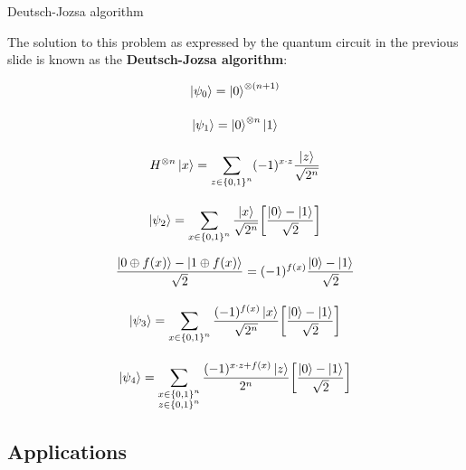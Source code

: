 \documentclass[9pt, handout, aspectratio=169]{beamer}	%
\begin{document}
\begin{frame}[allowframebreaks]{Deutsch-Jozsa algorithm}
\break

	The solution to this problem as expressed by the quantum circuit in the previous slide is known as the \textbf{Deutsch-Jozsa algorithm}:

	\begin{multicols}{2}

		\begin{gather*}
		  \ket{\psi_0} = \ket{0}^{\otimes \qty(n+1)} \\[10pt]
		  \ket{\psi_1} = \ket{0}^{\otimes n} \ket{1} \\[10pt]
			H^{\otimes n} \ket{x} =
		    \sum_{z \in \qty{0,1}^n} (-1)^{x \cdot z}
				\frac{\ket{z}}{\sqrt{2^n}} \\[10pt]
			\ket{\psi_2} =
		    \sum_{x \in \qty{0,1}^n} \frac{\ket{x}}{\sqrt{2^n}}
		    \qty[\frac{\ket{0}-\ket{1}}{\sqrt{2}}]
		\end{gather*}

		\columnbreak

		\begin{gather*}
		  \frac{\ket{0 \oplus f(x)}-\ket{1 \oplus f(x)}}{\sqrt{2}} =
		    (-1)^{f(x)} \frac{\ket{0}-\ket{1}}{\sqrt{2}} \\[10pt]
			\ket{\psi_3} =
		    \sum_{x \in \qty{0,1}^n} \frac{(-1)^{f(x)} \ket{x}}{\sqrt{2^n}}
		    \qty[\frac{\ket{0}-\ket{1}}{\sqrt{2}}] \\[10pt]
			\ket{\psi_4} =
		    \sum_{\substack{x \in \qty{0,1}^n \\ z \in \qty{0,1}^n}}
		    \frac{(-1)^{x \cdot z +f(x)} \ket{z}}{2^n}
		    \qty[\frac{\ket{0}-\ket{1}}{\sqrt{2}}]
		\end{gather*}

	\end{multicols}

\end{frame}


\subsection{Applications}
\end{document}
